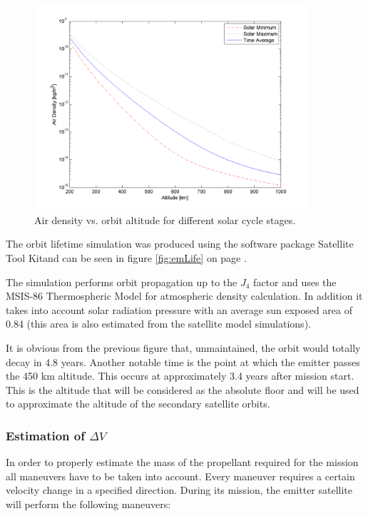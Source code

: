 \begin{figure}[ht]
\centering
\includegraphics[width=0.9\textwidth, angle=0]{chapters/img/densityAltitude.png}
\caption{Air density vs. orbit altitude for different solar cycle stages.}
\label{fig:densityProfile}
\end{figure}

The orbit lifetime simulation was produced using the software package Satellite Tool Kit\texttrademark and can be seen in figure \ref{fig:emLife} on page \pageref{fig:emLife}.

The simulation performs orbit propagation up to the $J_4$ factor and uses the MSIS-86 Thermospheric Model for atmospheric density calculation. In addition it takes into account solar radiation pressure with an average sun exposed area of 0.84 (this area is also estimated from the satellite model simulations).

It is obvious from the previous figure that, unmaintained, the orbit would totally decay in 4.8 years. Another notable time is the point at which the emitter passes the 450 km altitude. This occurs at approximately 3.4 years after mission start. This is the altitude that will be considered as the absolute floor and will be used to approximate the altitude of the secondary satellite orbits.

\subsubsection{Estimation of $\Delta V$}
\label{frEmDV}

In order to properly estimate the mass of the propellant required for the mission all maneuvers have to be taken into account. Every maneuver requires a certain velocity change in a specified direction. During its mission, the emitter satellite will perform the following maneuvers:

